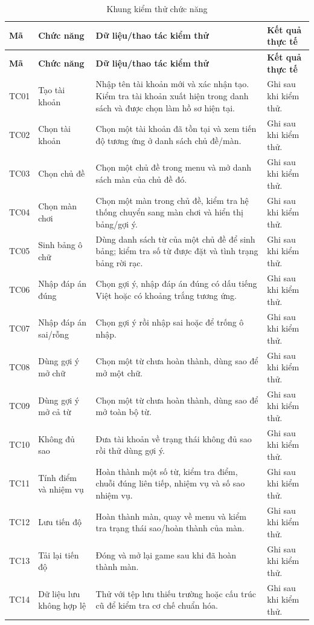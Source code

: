 \documentclass[../DoAn.tex]{subfiles}
\begin{document}
\begin{longtable}{|>{\RaggedRight\arraybackslash}p{1.5cm}|>{\RaggedRight\arraybackslash}p{3.0cm}|>{\RaggedRight\arraybackslash}p{4.5cm}|>{\RaggedRight\arraybackslash}p{4.0cm}|}
\caption{Khung kiểm thử chức năng}
\label{table:test_cases}\\
\hline
\textbf{Mã} & \textbf{Chức năng} & \textbf{Dữ liệu/thao tác kiểm thử} & \textbf{Kết quả thực tế} \\ \hline
\endfirsthead
\hline
\textbf{Mã} & \textbf{Chức năng} & \textbf{Dữ liệu/thao tác kiểm thử} & \textbf{Kết quả thực tế} \\ \hline
\endhead
TC01 & Tạo tài khoản & Nhập tên tài khoản mới và xác nhận tạo. Kiểm tra tài khoản xuất hiện trong danh sách và được chọn làm hồ sơ hiện tại. & Ghi sau khi kiểm thử. \\ \hline
TC02 & Chọn tài khoản & Chọn một tài khoản đã tồn tại và xem tiến độ tương ứng ở danh sách chủ đề/màn. & Ghi sau khi kiểm thử. \\ \hline
TC03 & Chọn chủ đề & Chọn một chủ đề trong menu và mở danh sách màn của chủ đề đó. & Ghi sau khi kiểm thử. \\ \hline
TC04 & Chọn màn chơi & Chọn một màn trong chủ đề, kiểm tra hệ thống chuyển sang màn chơi và hiển thị bảng/gợi ý. & Ghi sau khi kiểm thử. \\ \hline
TC05 & Sinh bảng ô chữ & Dùng danh sách từ của một chủ đề để sinh bảng; kiểm tra số từ được đặt và tình trạng bảng rời rạc. & Ghi sau khi kiểm thử. \\ \hline
TC06 & Nhập đáp án đúng & Chọn gợi ý, nhập đáp án đúng có dấu tiếng Việt hoặc có khoảng trắng tương ứng. & Ghi sau khi kiểm thử. \\ \hline
TC07 & Nhập đáp án sai/rỗng & Chọn gợi ý rồi nhập sai hoặc để trống ô nhập. & Ghi sau khi kiểm thử. \\ \hline
TC08 & Dùng gợi ý mở chữ & Chọn một từ chưa hoàn thành, dùng sao để mở một chữ. & Ghi sau khi kiểm thử. \\ \hline
TC09 & Dùng gợi ý mở cả từ & Chọn một từ chưa hoàn thành, dùng sao để mở toàn bộ từ. & Ghi sau khi kiểm thử. \\ \hline
TC10 & Không đủ sao & Đưa tài khoản về trạng thái không đủ sao rồi thử dùng gợi ý. & Ghi sau khi kiểm thử. \\ \hline
TC11 & Tính điểm và nhiệm vụ & Hoàn thành một số từ, kiểm tra điểm, chuỗi đúng liên tiếp, nhiệm vụ và số sao nhiệm vụ. & Ghi sau khi kiểm thử. \\ \hline
TC12 & Lưu tiến độ & Hoàn thành màn, quay về menu và kiểm tra trạng thái sao/hoàn thành của màn. & Ghi sau khi kiểm thử. \\ \hline
TC13 & Tải lại tiến độ & Đóng và mở lại game sau khi đã hoàn thành màn. & Ghi sau khi kiểm thử. \\ \hline
TC14 & Dữ liệu lưu không hợp lệ & Thử với tệp lưu thiếu trường hoặc cấu trúc cũ để kiểm tra cơ chế chuẩn hóa. & Ghi sau khi kiểm thử. \\ \hline
\end{longtable}
\end{document}
